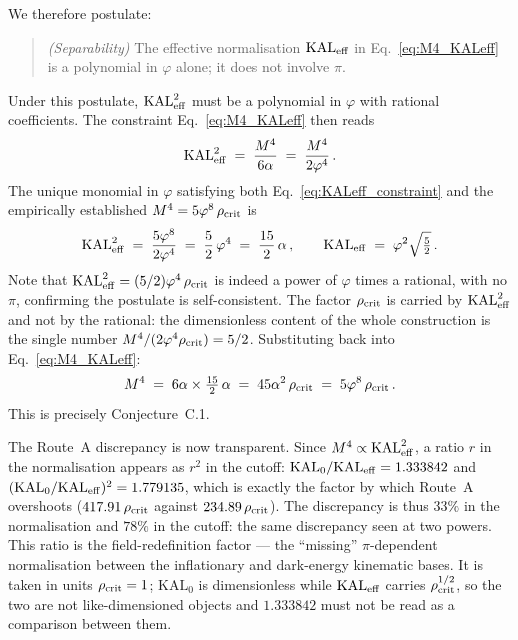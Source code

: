 \documentclass[12pt,a4paper]{article}
\newcommand{\phiG}{\varphi}
\newcommand{\KAL}{\mathrm{KAL}_0}
\newcommand{\KALeff}{\mathrm{KAL}_{\rm eff}}
\newcommand{\rhoc}{\rho_{\rm crit}}
\begin{document}
We therefore postulate:
\begin{quote}
\textit{(Separability)} The effective normalisation $\KALeff$ in
Eq.~\eqref{eq:M4_KALeff} is a polynomial in $\phiG$ alone; it does not
involve $\pi$.
\end{quote}

Under this postulate, $\KALeff^2$ must be a polynomial in $\phiG$ with rational
coefficients.
The constraint Eq.~\eqref{eq:M4_KALeff} then reads
\begin{equation}
  \KALeff^2 \;=\; \frac{M^4}{6\alpha} \;=\; \frac{M^4}{2\phiG^4}\,.
  \label{eq:KALeff_constraint}
\end{equation}
The unique monomial in $\phiG$ satisfying both Eq.~\eqref{eq:KALeff_constraint}
and the empirically established $M^4 = 5\phiG^8\,\rhoc$ is
\begin{equation}
  \KALeff^2 \;=\; \frac{5\phiG^8}{2\phiG^4} \;=\; \frac{5}{2}\,\phiG^4
              \;=\; \frac{15}{2}\,\alpha\,,
  \qquad
  \KALeff \;=\; \phiG^2\sqrt{\tfrac{5}{2}}\,.
  \label{eq:KALeff_result}
\end{equation}
Note that $\KALeff^2 = (5/2)\phiG^4\,\rhoc$ is indeed a power of $\phiG$ times
a rational, with no $\pi$, confirming the postulate is self-consistent. The
factor $\rhoc$ is carried by $\KALeff^2$ and not by the rational: the
dimensionless content of the whole construction is the single number
$M^4/(2\phiG^4\rhoc) = 5/2$.
Substituting back into Eq.~\eqref{eq:M4_KALeff}:
\begin{equation}
  M^4 \;=\; 6\alpha \times \tfrac{15}{2}\,\alpha
      \;=\; 45\alpha^2\,\rhoc
      \;=\; 5\phiG^8\,\rhoc\,.
  \label{eq:M4_conditional}
\end{equation}
This is precisely Conjecture~C.1.

The Route~A discrepancy is now transparent. Since $M^4 \propto \KALeff^2$, a
ratio $r$ in the normalisation appears as $r^2$ in the cutoff:
$\KAL/\KALeff = 1.333842$ and $(\KAL/\KALeff)^2 = 1.779135$, which is exactly
the factor by which Route~A overshoots ($417.91\,\rhoc$ against
$234.89\,\rhoc$). The discrepancy is thus $33\%$ in the normalisation and
$78\%$ in the cutoff: the same discrepancy seen at two powers. This ratio is
the field-redefinition factor --- the ``missing'' $\pi$-dependent normalisation
between the inflationary and dark-energy kinematic bases. It is taken in units
$\rhoc = 1$; $\KAL$ is dimensionless while $\KALeff$ carries $\rhoc^{1/2}$, so
the two are not like-dimensioned objects and $1.333842$ must not be read as a
comparison between them.
\end{document}
